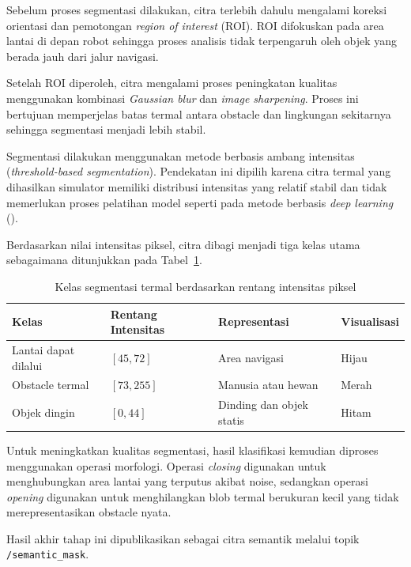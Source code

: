 Sebelum proses segmentasi dilakukan, citra terlebih dahulu mengalami koreksi orientasi dan pemotongan \textit{region of interest} (ROI). ROI difokuskan pada area lantai di depan robot sehingga proses analisis tidak terpengaruh oleh objek yang berada jauh dari jalur navigasi.

Setelah ROI diperoleh, citra mengalami proses peningkatan kualitas menggunakan kombinasi \textit{Gaussian blur} dan \textit{image sharpening}. Proses ini bertujuan memperjelas batas termal antara obstacle dan lingkungan sekitarnya sehingga segmentasi menjadi lebih stabil.

Segmentasi dilakukan menggunakan metode berbasis ambang intensitas (\textit{threshold-based segmentation}). Pendekatan ini dipilih karena citra termal yang dihasilkan simulator memiliki distribusi intensitas yang relatif stabil dan tidak memerlukan proses pelatihan model seperti pada metode berbasis \textit{deep learning} (\cite{Castro2016}).

Berdasarkan nilai intensitas piksel, citra dibagi menjadi tiga kelas utama sebagaimana ditunjukkan pada Tabel~\ref{tab:kelas_segmentasi_termal}.

\begin{table}[H]
\centering
\caption{Kelas segmentasi termal berdasarkan rentang intensitas piksel}
\label{tab:kelas_segmentasi_termal}
\begin{tabular}{llll}
\toprule
\textbf{Kelas} &
\textbf{Rentang Intensitas} &
\textbf{Representasi} &
\textbf{Visualisasi} \\
\midrule
Lantai dapat dilalui &
$[45,72]$ &
Area navigasi &
Hijau \\

Obstacle termal &
$[73,255]$ &
Manusia atau hewan &
Merah \\

Objek dingin &
$[0,44]$ &
Dinding dan objek statis &
Hitam \\
\bottomrule
\end{tabular}
\end{table}

Untuk meningkatkan kualitas segmentasi, hasil klasifikasi kemudian diproses menggunakan operasi morfologi. Operasi \textit{closing} digunakan untuk menghubungkan area lantai yang terputus akibat noise, sedangkan operasi \textit{opening} digunakan untuk menghilangkan blob termal berukuran kecil yang tidak merepresentasikan obstacle nyata.

Hasil akhir tahap ini dipublikasikan sebagai citra semantik melalui topik \texttt{/semantic\_m\-ask}.

